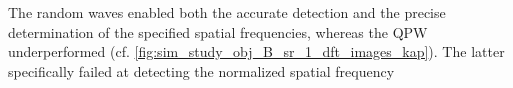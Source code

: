 The random waves enabled both
the accurate detection and
the precise determination of
the specified spatial frequencies, whereas
the \ac{QPW} underperformed
(cf. \cref{fig:sim_study_obj_B_sr_1_dft_images_kap}).
The latter specifically failed at detecting
the normalized spatial frequency
